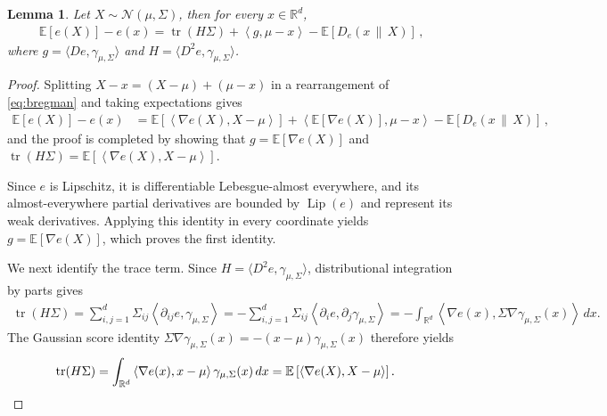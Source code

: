\documentclass[11pt]{article}
\newtheorem{lemma}[lemma]{Lemma}
\newcommand{\R}{\mathbb R}
\newcommand{\E}{\mathbb E}
\newcommand{\N}{\mathcal N}
\newcommand{\tr}{\operatorname{tr}}
\newcommand{\Lip}{\operatorname{Lip}}
\newcommand{\1}{\mathbf 1}
\newcommand{\ip}[2]{\left\langle #1,#2\right\rangle}
\begin{document}
\begin{lemma}
    \label{lem:regret-switch}
    Let $X\sim\N(\mu,\Sigma)$, then for every $x\in\R^d$,
    \begin{align}
        \E[e(X)]-e(x)
        =\tr(H\Sigma)+\ip{g}{\mu-x}-\E[D_e(x\,\|\,X)]\,,
        \label{eq:regret-switch}
    \end{align}
    where $g=\langle De,\gamma_{\mu,\Sigma}\rangle$ and
    $H=\langle D^2e,\gamma_{\mu,\Sigma}\rangle$.
\end{lemma}
\begin{proof}
    Splitting $X-x=(X-\mu)+(\mu-x)$ in a rearrangement of \eqref{eq:bregman} and taking expectations gives
    \begin{align}
        \E[e(X)]-e(x)
         & =
        \E\left[\ip{\nabla e(X)}{X-\mu}\right]
        +
        \ip{\E[\nabla e(X)]}{\mu-x}
        -
        \E[D_e(x\,\|\,X)]\,,
    \end{align}
    and the proof is completed by showing that $g=\E[\nabla e(X)]$ and
    $\tr(H\Sigma)=\E[\ip{\nabla e(X)}{X-\mu}]$.

    Since $e$ is Lipschitz, it is differentiable Lebesgue-almost everywhere,
    and its almost-everywhere partial derivatives are bounded by $\Lip(e)$
    and represent its weak derivatives.
    Applying this identity in every coordinate yields $g=\E[\nabla e(X)]$,
    which proves the first identity.

    We next identify the trace term. Since
    $H=\langle D^2e,\gamma_{\mu,\Sigma}\rangle$,
    distributional integration by parts gives
    \begin{align}
        \tr(H\Sigma)
        =
        \sum_{i,j=1}^d
        \Sigma_{ij}
        \left\langle
        \partial_{ij}e,
        \gamma_{\mu,\Sigma}
        \right\rangle
        =
        -\sum_{i,j=1}^d
        \Sigma_{ij}
        \left\langle
        \partial_i e,
        \partial_j\gamma_{\mu,\Sigma}
        \right\rangle
        =
        -\int_{\R^d}
        \left\langle
        \nabla e(x),
        \Sigma\nabla\gamma_{\mu,\Sigma}(x)
        \right\rangle
        \,dx.
    \end{align}
    The Gaussian score identity
    $\Sigma\nabla\gamma_{\mu,\Sigma}(x)
        =
        -(x-\mu)\gamma_{\mu,\Sigma}(x)$
    therefore yields
    \begin{align}
        \tr(H\Sigma)
         & =
        \int_{\R^d}
        \left\langle
        \nabla e(x),
        x-\mu
        \right\rangle
        \gamma_{\mu,\Sigma}(x)\,dx
        =
        \E\left[
            \left\langle
            \nabla e(X),
            X-\mu
            \right\rangle
            \right].
        \qedhere
    \end{align}
\end{proof}
\end{document}

